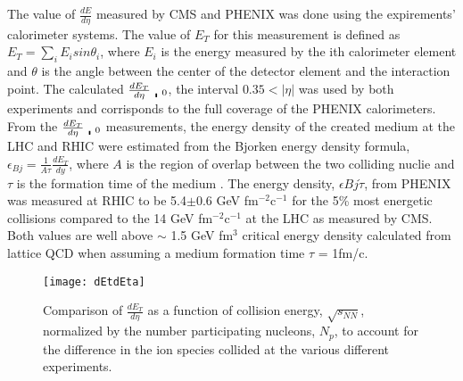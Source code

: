     The value of $\frac{dE}{d\eta}$ measured by CMS \cite{cmsEt} and PHENIX 
      \cite{phenixDeDeta} was done using the expirements' calorimeter systems.
    The value of $E_{T}$ for this measurement is defined as 
      $E_{T}=\sum_{i}E_{i}sin\theta_{i}$, where $E_{i}$ is the energy measured 
      by the ith calorimeter element and $\theta$ is the angle between the 
      center of the detector element and the interaction point. 
    The calculated $\frac{dE_{T}}{d\eta}\bracevert_{0}$, the interval 
      $0.35<|\eta|$ was used by both experiments and corrisponds to the full
      coverage of the PHENIX calorimeters. 
    From the $\frac{dE_{T}}{d\eta}\bracevert_{0}$ measurements, the energy 
      density of the created medium at the LHC and RHIC were estimated from the
      Bjorken energy density formula, 
      $\epsilon_{Bj}=\frac{1}{A\tau}\frac{dE_{T}}{dy}$, where $A$ is the region
      of overlap between the two colliding nuclie and $\tau$ is the formation
      time of the medium \cite{bjEdense}.
    The energy density, $\epsilon{Bj}\dot\tau$, from PHENIX was measured at
      RHIC to be 5.4$\pm$0.6 GeV fm$^{-2}$c$^{-1}$ for the 5\% most energetic 
      collisions compared to the 14 GeV fm$^{-2}$c$^{-1}$ at the LHC as 
      measured by CMS. 
    Both values are well above $\sim$ 1.5 GeV fm$^{3}$ critical energy density
      calculated from lattice QCD when assuming a medium formation time $\tau$ 
      = 1fm/c.
      \begin{figure}[!Hhbt]
        \centering
        \texttt{[image: dEtdEta]}
        \caption{Comparison of $\frac{dE_{T}}{d\eta}$ as a function of 
          collision energy, $\sqrt{s_{NN}}$, normalized by the number 
          participating nucleons, $N_{p}$, to account for the difference in 
          the ion species collided at the various different experiments.}
        \label{fig:dEtdEta}
      \end{figure}

